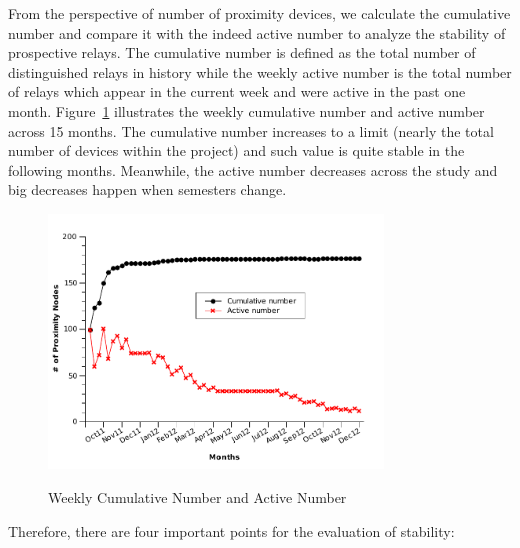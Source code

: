 From the perspective of number of proximity devices, we calculate the cumulative number and compare it with the indeed active number to analyze the stability of prospective relays. The cumulative number is defined as the total number of distinguished relays in history while the weekly active number is the total number of relays which appear in the current week and were active in the past one month. Figure~\ref{fig:cumulative_active} illustrates the weekly cumulative number and active number across 15 months. The cumulative number increases to a limit (nearly the total number of devices within the project) and such value is quite stable in the following months. Meanwhile, the active number decreases across the study and big decreases happen when semesters change.  

\begin{figure}[tbp]
\centering 
{\includegraphics[width=3.5in]{graphs/cumulative_active.pdf}}
\caption{Weekly Cumulative Number and Active Number} 
\label{fig:cumulative_active}
\end{figure} 

Therefore, there are four important points for the evaluation of stability:

